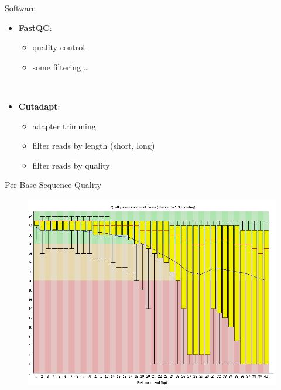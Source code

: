 \begin{frame}{Software}

\begin{itemize}
\itemsep1pt\parskip0pt
\item
  \textbf{FastQC}:

  \begin{itemize}
  \itemsep1pt\parskip0pt
  \item
    quality control
  \item
    some filtering \ldots{}
  \end{itemize}
\end{itemize}

~

\begin{itemize}
\itemsep1pt\parskip0pt
\item
  \textbf{Cutadapt}:

  \begin{itemize}
  \itemsep1pt\parskip0pt
  \item
    adapter trimming
  \item
    filter reads by length (short, long)
  \item
    filter reads by quality
  \end{itemize}
\end{itemize}

\end{frame}

\begin{frame}{Per Base Sequence Quality}

\begin{figure}[htbp]
\centering
\includegraphics[width=\textwidth,height=0.8\textheight,keepaspectratio]{images/per_base_quality}
\end{figure}

\end{frame}

